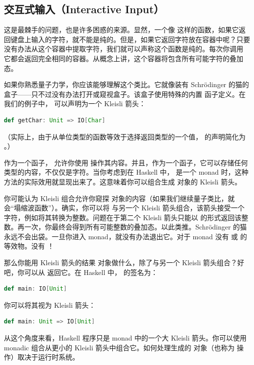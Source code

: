 \subsection{交互式输入（Interactive Input）}

这是最棘手的问题，也是许多困惑的来源。显然，一个像  这样的函数，如果它返回键盘上输入的字符，就不能是纯的。但是，如果它返回字符放在容器中呢？只要没有办法从这个容器中提取字符，我们就可以声称这个函数是纯的。每次你调用  它都会返回完全相同的容器。从概念上讲，这个容器将包含所有可能字符的叠加态。

如果你熟悉量子力学，你应该能够理解这个类比。它就像装有 Schrödinger 的猫的盒子——只不过没有办法打开或窥视盒子。该盒子使用特殊的内置  函子定义。在我们的例子中， 可以声明为一个 Kleisli 箭头：

\begin{lstlisting}[language=Scala]
def getChar: Unit => IO[Char]

\end{lstlisting}
（实际上，由于从单位类型的函数等效于选择返回类型的一个值， 的声明简化为 。）

作为一个函子， 允许你使用  操作其内容。并且，作为一个函子，它可以存储任何类型的内容，不仅仅是字符。当你考虑到在 Haskell 中， 是一个 monad 时，这种方法的实际效用就显现出来了。这意味着你可以组合生成  对象的 Kleisli 箭头。

你可能认为 Kleisli 组合允许你窥探  对象的内容（如果我们继续量子类比，就会“塌缩波函数”）。确实，你可以将  与另一个 Kleisli 箭头组合，该箭头接受一个字符，例如将其转换为整数。问题在于第二个 Kleisli 箭头只能以  的形式返回该整数。再一次，你最终会得到所有可能整数的叠加态。以此类推。Schrödinger 的猫永远不会出袋。一旦你进入  monad，就没有办法退出它。对于  monad 没有  或  的等效物。没有 ！

那么你能用 Kleisli 箭头的结果  对象做什么，除了与另一个 Kleisli 箭头组合？好吧，你可以从  返回它。在 Haskell 中， 的签名为：

\begin{lstlisting}[language=Scala]
def main: IO[Unit]
\end{lstlisting}
你可以将其视为 Kleisli 箭头：

\begin{lstlisting}[language=Scala]
def main: Unit => IO[Unit]
\end{lstlisting}
从这个角度来看，Haskell 程序只是  monad 中的一个大 Kleisli 箭头。你可以使用 monadic 组合从更小的 Kleisli 箭头中组合它。如何处理生成的  对象（也称为  操作）取决于运行时系统。

